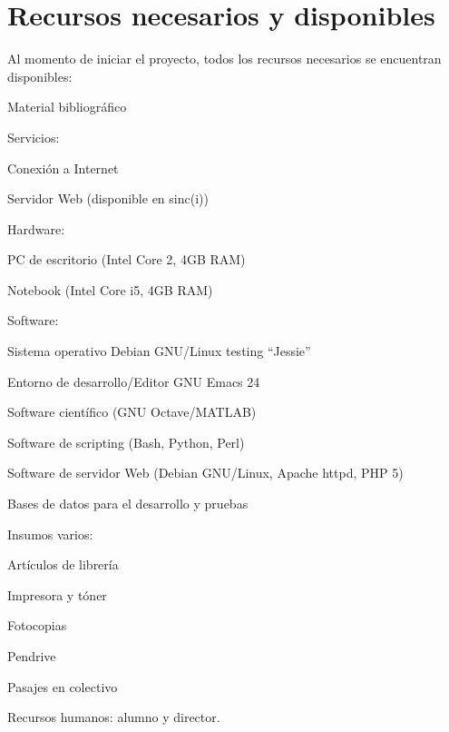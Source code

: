 \documentclass[12pt,bibliography=oldstyle,DIV=12,parskip=full-,titlepage]{scrartcl}
\begin{document}
\section{Recursos necesarios y disponibles}
Al momento de iniciar el proyecto, todos los recursos necesarios se
encuentran disponibles:
\begin{itemize*}
\item Material bibliográfico
\item Servicios:
  \begin{itemize*}
  \item Conexión a Internet
  \item Servidor Web (disponible en sinc(i))
  \end{itemize*}
\item Hardware:
  \begin{itemize*}
  \item PC de escritorio (Intel Core 2, 4GB RAM)
  \item Notebook (Intel Core i5, 4GB RAM)
  \end{itemize*}
\item Software:
  \begin{itemize*}
  \item Sistema operativo Debian GNU/Linux testing ``Jessie''
  \item Entorno de desarrollo/Editor GNU Emacs 24
  \item Software científico (GNU Octave/MATLAB)
  \item Software de scripting (Bash, Python, Perl)
  \item Software de servidor Web (Debian GNU/Linux, Apache
    httpd, PHP 5)
  \end{itemize*}
\item Bases de datos para el desarrollo y pruebas
\item Insumos varios:
  \begin{itemize*}
  \item Artículos de librería
  \item Impresora y tóner
  \item Fotocopias
  \item Pendrive
  \item Pasajes en colectivo
  \end{itemize*}
\item Recursos humanos: alumno y director.
\end{itemize*}
%
%
\newpage
\end{document}
